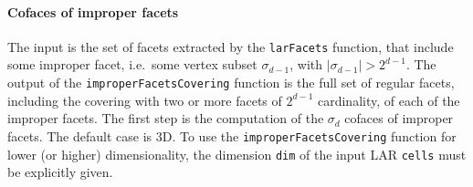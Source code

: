 \documentclass[11pt,oneside]{article}	%
\begin{document}
\paragraph{Cofaces of improper facets}

The input is the set of facets extracted by the \texttt{larFacets} function, that include some improper facet, i.e.~some vertex subset $\sigma_{d-1}$, with $|\sigma_{d-1}|>2^{d-1}$.
The output of the \texttt{improperFacetsCovering} function is the full set of regular facets, including the covering  with two or more facets of $2^{d-1}$ cardinality, of each of the improper facets. The first step is the computation of the $\sigma_{d}$ cofaces of improper facets.
The default case is 3D. To use the \texttt{improperFacetsCovering} function for lower (or higher) dimensionality, the dimension \texttt{dim} of the input LAR \texttt{cells} must be explicitly given.
\end{document}
